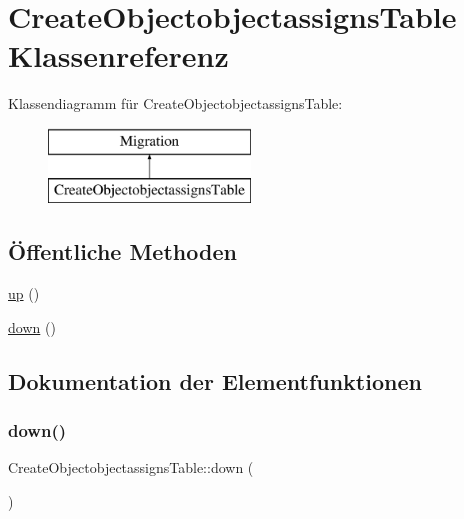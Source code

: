 \hypertarget{classCreateObjectobjectassignsTable}{}\section{Create\+Objectobjectassigns\+Table Klassenreferenz}
\label{classCreateObjectobjectassignsTable}
Klassendiagramm für Create\+Objectobjectassigns\+Table\+:\begin{figure}[H]
\begin{center}
\leavevmode
\includegraphics[height=2.000000cm]{dc/d7a/classCreateObjectobjectassignsTable}
\end{center}
\end{figure}
\subsection*{Öffentliche Methoden}
\begin{DoxyCompactItemize}
\item 
\hyperlink{classCreateObjectobjectassignsTable_a96edf1d650638d9dd293e59e985615f4}{up} ()
\item 
\hyperlink{classCreateObjectobjectassignsTable_a11c873f95076b661d5bc3c96760bb2a2}{down} ()
\end{DoxyCompactItemize}


\subsection{Dokumentation der Elementfunktionen}
\mbox{\label{classCreateObjectobjectassignsTable_a11c873f95076b661d5bc3c96760bb2a2}} 
\subsubsection{\texorpdfstring{down()}{down()}}
{\footnotesize\ttfamily Create\+Objectobjectassigns\+Table\+::down (\begin{DoxyParamCaption}{ }\end{DoxyParamCaption})}

